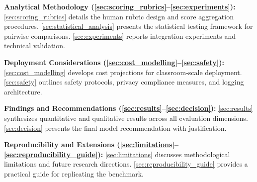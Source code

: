 \textbf{Analytical Methodology (\cref{sec:scoring_rubrics}--\cref{sec:experiments}):} \cref{sec:scoring_rubrics} details the human rubric design and score aggregation procedures. \cref{sec:statistical_analysis} presents the statistical testing framework for pairwise comparisons. \cref{sec:experiments} reports integration experiments and technical validation.

\textbf{Deployment Considerations (\cref{sec:cost_modelling}--\cref{sec:safety}):} \cref{sec:cost_modelling} develops cost projections for classroom-scale deployment. \cref{sec:safety} outlines safety protocols, privacy compliance measures, and logging architecture.

\textbf{Findings and Recommendations (\cref{sec:results}--\cref{sec:decision}):} \cref{sec:results} synthesizes quantitative and qualitative results across all evaluation dimensions. \cref{sec:decision} presents the final model recommendation with justification.

\textbf{Reproducibility and Extensions (\cref{sec:limitations}--\cref{sec:reproducibility_guide}):} \cref{sec:limitations} discusses methodological limitations and future research directions. \cref{sec:reproducibility_guide} provides a practical guide for replicating the benchmark.

